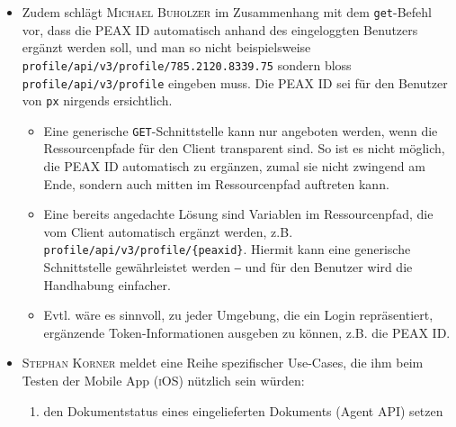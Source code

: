 \begin{itemize}
\begin{itemize}
        \item \textsc{Go} bietet mit \texttt{json.Indent} eine sehr komfortable Funktion, womit ein beliebiger JSON-Payload\footnote{D.h. nicht nur ein JSON-Payload, dessen Struktur mittels einer \texttt{struct} und den entsprechenden Annotations beschrieben ist, was zu einem unverhältnismässigen Mehraufwand führen würde, zumal dann jeder mögliche Payload statisch beschrieben sein müsste.} einfach formatiert werden kann.
        \item Der Vorschlag kommt ins Backlog ‒ jedoch mit tiefer Priorität, da das Problem mithilfe von \texttt{jq} einfach gelöst werden kann. Weitere Features im Zusammenhang mit generischer JSON-Verarbeitung sollen der \textsc{Unix}-Philosophie entsprechend an \texttt{jq} oder ähnliche Programme mittels Pipe delegiert werden.
    \end{itemize}
\item Zudem schlägt \textsc{Michael Buholzer} im Zusammenhang mit dem \texttt{get}-Befehl vor, dass die PEAX ID automatisch anhand des eingeloggten Benutzers ergänzt werden soll, und man so nicht beispielsweise \texttt{profile/api/v3/profile/785.2120.8339.75} sondern bloss \texttt{profile/api/v3/profile} eingeben muss. Die PEAX ID sei für den Benutzer von \texttt{px} nirgends ersichtlich.
    \begin{itemize}
        \item Eine generische \texttt{GET}-Schnittstelle kann nur angeboten werden, wenn die Ressourcenpfade für den Client transparent sind. So ist es nicht möglich, die PEAX ID automatisch zu ergänzen, zumal sie nicht zwingend am Ende, sondern auch mitten im Ressourcenpfad auftreten kann.
        \item Eine bereits angedachte Lösung sind Variablen im Ressourcenpfad, die vom Client automatisch ergänzt werden, z.B. \texttt{profile/api/v3/profile/\{peaxid\}}. Hiermit kann eine generische Schnittstelle gewährleistet werden ‒ und für den Benutzer wird die Handhabung einfacher.
        \item Evtl. wäre es sinnvoll, zu jeder Umgebung, die ein Login repräsentiert, ergänzende Token-Informationen ausgeben zu können, z.B. die PEAX ID.
    \end{itemize}
    \item \textsc{Stephan Korner} meldet eine Reihe spezifischer Use-Cases, die ihm beim Testen der Mobile App (\textsc{iOS}) nützlich sein würden:
        \begin{enumerate}
            \item den Dokumentstatus eines eingelieferten Dokuments (Agent API) setzen

\end{enumerate}
\end{itemize}
